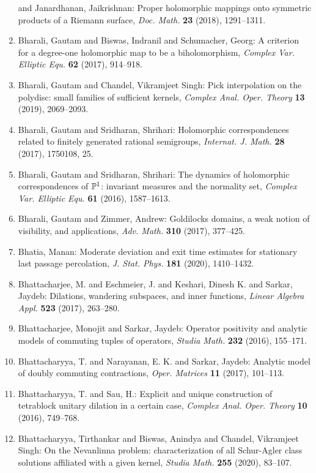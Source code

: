 \begin{enumerate}
and Janardhanan, Jaikrishnan: Proper holomorphic mappings onto symmetric products of a
{R}iemann surface, \emph{Doc. Math.} {\bf 23} (2018), 1291--1311.
\item Bharali, Gautam and Biswas, Indranil and Schumacher, Georg: A criterion for a degree-one holomorphic map to be a
biholomorphism, \emph{Complex Var. Elliptic Equ.} {\bf 62} (2017), 914--918.
\item Bharali, Gautam and Chandel, Vikramjeet Singh: Pick interpolation on the polydisc: small families of
sufficient kernels, \emph{Complex Anal. Oper. Theory} {\bf 13} (2019), 2069--2093.
\item Bharali, Gautam and Sridharan, Shrihari: Holomorphic correspondences related to finitely generated
rational semigroups, \emph{Internat. J. Math.} {\bf 28} (2017), 1750108, 25.
\item Bharali, Gautam and Sridharan, Shrihari: The dynamics of holomorphic correspondences of {$\Bbb P^1$}:
invariant measures and the normality set, \emph{Complex Var. Elliptic Equ.} {\bf 61} (2016), 1587--1613.
\item Bharali, Gautam and Zimmer, Andrew: Goldilocks domains, a weak notion of visibility, and
applications, \emph{Adv. Math.} {\bf 310} (2017), 377--425.
\item Bhatia, Manan: Moderate deviation and exit time estimates for stationary last
passage percolation, \emph{J. Stat. Phys.} {\bf 181} (2020), 1410--1432.
\item Bhattacharjee, M. and Eschmeier, J. and Keshari, Dinesh K. and
Sarkar, Jaydeb: Dilations, wandering subspaces, and inner functions, \emph{Linear Algebra Appl.} {\bf 523} (2017), 263--280.
\item Bhattacharjee, Monojit and Sarkar, Jaydeb: Operator positivity and analytic models of commuting tuples of
operators, \emph{Studia Math.} {\bf 232} (2016), 155--171.
\item Bhattacharyya, T. and Narayanan, E. K. and Sarkar, Jaydeb: Analytic model of doubly commuting contractions, \emph{Oper. Matrices} {\bf 11} (2017), 101--113.
\item Bhattacharyya, T. and Sau, H.: Explicit and unique construction of tetrablock unitary
dilation in a certain case, \emph{Complex Anal. Oper. Theory} {\bf 10} (2016), 749--768.
\item Bhattacharyya, Tirthankar and Biswas, Anindya and Chandel,
Vikramjeet Singh: On the {N}evanlinna problem: characterization of all
{S}chur-{A}gler class solutions affiliated with a given
kernel, \emph{Studia Math.} {\bf 255} (2020), 83--107.

\end{enumerate}
